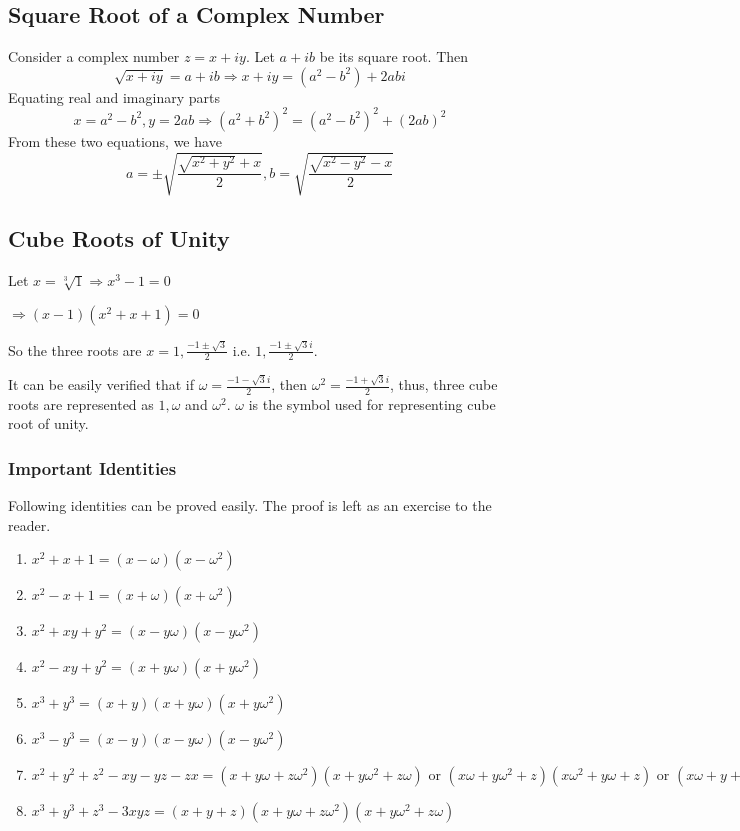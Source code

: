 \subsection{Square Root of a Complex Number}
Consider a complex number $z = x + iy$. Let $a + ib$ be its square root. Then
$$\sqrt{x + iy} = a + ib \Rightarrow x + iy = (a^2 - b^2) + 2abi$$
Equating real and imaginary parts
$$x = a^2 - b^2, y = 2ab \Rightarrow (a^2 + b^2)^2 = (a^2 - b^2)^2 + (2ab)^2$$
From these two equations, we have
$$a = \pm\sqrt{\frac{\sqrt{x^2 + y^2} + x}{2}}, b = \sqrt{\frac{\sqrt{x^2 - y^2} - x}{2}}$$
\subsection{Cube Roots of Unity}
Let $x = \sqrt[3]{1} \Rightarrow x^3 - 1 = 0$

$\Rightarrow (x - 1)(x^2 + x + 1 ) = 0$

So the three roots are $x = 1, \frac{-1 \pm \sqrt{3}}{2}$ i.e. $1, \frac{-1\pm \sqrt{3}i}{2}$.

It can be easily verified that if $\omega = \frac{-1 -\sqrt{3}i}{2}$, then $\omega^2 = \frac{-1 + \sqrt{3}i}{2}$, thus, three cube
roots are represented as $1, \omega$ and $\omega^2$. $\omega$ is the symbol used for representing cube root of unity.
\subsubsection{Important Identities}
Following identities can be proved easily. The proof is left as an exercise to the reader.
\begin{enumerate}
\item $x^2 + x + 1 = (x - \omega)(x - \omega^2)$
\item $x^2 - x + 1 = (x + \omega)(x + \omega^2)$
\item $x^2 + xy + y^2 = (x - y\omega)(x - y\omega^2)$
\item $x^2 - xy + y^2 = (x + y\omega)(x + y\omega^2)$
\item $x^3 + y^3 = (x + y)(x + y\omega)(x + y\omega^2)$
\item $x^3 - y^3 = (x - y)(x - y\omega)(x - y\omega^2)$
\item $x^2 + y^2 + z^2 - xy - yz - zx = (x + y\omega + z\omega^2)(x + y\omega^2 + z\omega) \text{~or~} (x\omega + y\omega^2 +
  z)(x\omega^2 + y\omega + z)
  \text{~or~}(x\omega + y + z\omega^2)(x\omega^2 + y + z\omega)$
\item $x^3 + y^3 + z^3 - 3xyz = (x + y + z)(x + y\omega + z\omega^2)(x+ y\omega^2 + z\omega)$
\end{enumerate}

